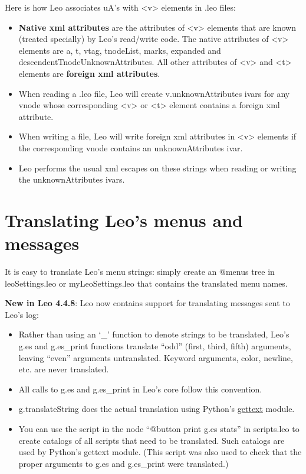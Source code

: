 \documentclass[a4paper,10pt,english]{sphinxmanual}
\begin{document}
Here is how Leo associates uA's with \textless{}v\textgreater{} elements in .leo files:
\begin{itemize}
\item {} 
\textbf{Native xml attributes} are the attributes of \textless{}v\textgreater{} elements that are
known (treated specially) by Leo's read/write code. The native attributes of
\textless{}v\textgreater{} elements are a, t, vtag, tnodeList, marks,
expanded and descendentTnodeUnknownAttributes. All other attributes of
\textless{}v\textgreater{} and \textless{}t\textgreater{} elements are \textbf{foreign xml attributes}.

\item {} 
When reading a .leo file, Leo will create v.unknownAttributes ivars for
any vnode whose corresponding \textless{}v\textgreater{} or \textless{}t\textgreater{} element contains a
foreign xml attribute.

\item {} 
When writing a file, Leo will write foreign xml attributes in \textless{}v\textgreater{} elements
if the corresponding vnode contains an unknownAttributes ivar.

\item {} 
Leo performs the usual xml escapes on these strings when reading or writing
the unknownAttributes ivars.

\end{itemize}


\section{Translating Leo's menus and messages}
\label{customizing:translating-leo-s-menus-and-messages}
It is easy to translate Leo's menu strings: simply create an @menus tree in
leoSettings.leo or myLeoSettings.leo that contains the translated menu names.

\textbf{New in Leo 4.4.8}:
Leo now contains support for translating messages sent to Leo's log:
\begin{itemize}
\item {} 
Rather than using an `\_' function to denote strings to be translated, Leo's
g.es and g.es\_print functions translate ``odd'' (first, third, fifth) arguments,
leaving ``even'' arguments untranslated. Keyword arguments, color, newline, etc.
are never translated.

\item {} 
All calls to g.es and g.es\_print in Leo's core follow this convention.

\item {} 
g.translateString does the actual translation using Python's \href{http://docs.python.org/lib/module-gettext.html}{gettext} module.

\item {} 
You can use the script in the node ``@button print g.es stats'' in scripts.leo
to create catalogs of all scripts that need to be translated. Such catalogs
are used by Python's gettext module. (This script was also used to check that
the proper arguments to g.es and g.es\_print were translated.)

\end{itemize}
\end{document}
